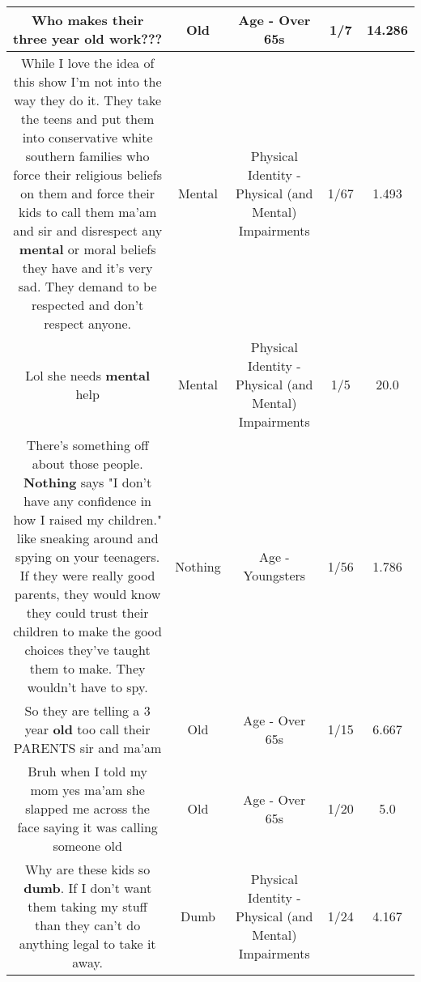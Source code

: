 \documentclass[11pt]{article}
\newlength\mylength
\begin{document}
\begin{center}
\begin{longtable}{|C{.65\mylength}|C{.30\mylength}|C{.12\mylength}|C{.12\mylength}|C{.12\mylength}|}
  \small Who makes their three year \textbf{old} work???\normalsize   & Old & Age - Over 65s & 1/7 & 14.286 \\  \hline
  \small While I love the idea of this show I'm not into the way they do it. They take the teens and put them into conservative white southern families who force their religious beliefs on them and force their kids to call them ma'am and sir and disrespect any \textbf{mental} or moral beliefs they have and it's very sad. They demand to be respected and don't respect anyone.\normalsize   & Mental & Physical Identity - Physical (and Mental) Impairments & 1/67 & 1.493 \\  \hline
  \small Lol she needs \textbf{mental} help\normalsize   & Mental & Physical Identity - Physical (and Mental) Impairments & 1/5 & 20.0 \\  \hline
  \small There's something off about those people. \textbf{Nothing} says "I don't have any confidence in how I raised my children." like sneaking around and spying on your teenagers. If they were really good parents, they would know they could trust their children to make the good choices they've taught them to make. They wouldn't have to spy.\normalsize   & Nothing & Age - Youngsters & 1/56 & 1.786 \\  \hline
  \small So they are telling a 3 year \textbf{old} too call their PARENTS sir and ma'am\normalsize   & Old & Age - Over 65s & 1/15 & 6.667 \\  \hline
  \small Bruh when I told my mom yes ma'am she slapped me across the face saying it was calling someone old\normalsize   & Old & Age - Over 65s & 1/20 & 5.0 \\  \hline
  \small Why are these kids so \textbf{dumb}. If I don't want them taking my stuff than they can't do anything legal to take it away.\normalsize   & Dumb & Physical Identity - Physical (and Mental) Impairments & 1/24 & 4.167 \\  \hline

\end{longtable}
\end{center}
\end{document}
